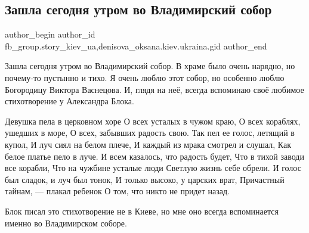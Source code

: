  
 
 
 
 
 
\subsection{Зашла сегодня утром во Владимирский собор}
\label{sec:06_01_2022.fb.fb_group.story_kiev_ua.1.vladimirskij_sobor}
 
\ifcmt
 author_begin
   author_id fb_group.story_kiev_ua,denisova_oksana.kiev.ukraina.gid
 author_end
\fi

Зашла сегодня утром во Владимирский собор. В храме было очень нарядно, но
почему-то пустынно и тихо. Я очень люблю этот собор, но особенно люблю
Богородицу Виктора Васнецова. И, глядя на неё, всегда вспоминаю своё любимое
стихотворение у Александра Блока.


\raggedcolumns
\begin{multicols}{2} %
\setlength{\parindent}{0pt}

\obeycr
Девушка пела в церковном хоре
О всех усталых в чужом краю,
О всех кораблях, ушедших в море,
О всех, забывших радость свою.
\smallskip
Так пел ее голос, летящий в купол,
И луч сиял на белом плече,
И каждый из мрака смотрел и слушал,
Как белое платье пело в луче.
\smallskip
И всем казалось, что радость будет,
Что в тихой заводи все корабли,
Что на чужбине усталые люди
Светлую жизнь себе обрели.
\smallskip
И голос был сладок, и луч был тонок,
И только высоко, у царских врат,
Причастный тайнам, — плакал ребенок
О том, что никто не придет назад.
\restorecr

\columnbreak
{}
\end{multicols} %

Блок писал это стихотворение не в Киеве, но мне оно всегда вспоминается именно
во Владимирском соборе.

